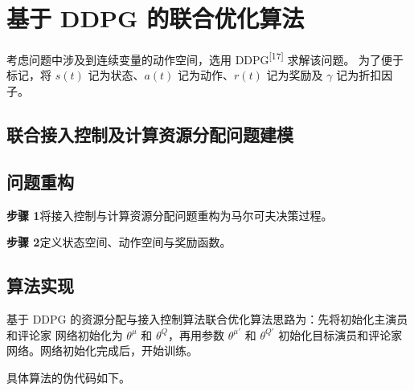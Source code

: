 \section{基于 DDPG 的联合优化算法}

\dotsline
考虑问题中涉及到连续变量的动作空间，选用 DDPG\textsuperscript{[17]} 求解该问题。
为了便于标记，将 $s(t)$ 记为状态、$a(t)$ 记为动作、$r(t)$ 记为奖励及
$\gamma$ 记为折扣因子。

\subsection{联合接入控制及计算资源分配问题建模}

\dotsline

\subsection{问题重构}

\dotsline

\textbf{步骤 1}\quad 将接入控制与计算资源分配问题重构为马尔可夫决策过程。\par
\textbf{步骤 2}\quad 定义状态空间、动作空间与奖励函数。

\subsection{算法实现}

基于 DDPG 的资源分配与接入控制算法联合优化算法思路为：先将初始化主演员和评论家
网络初始化为 $\theta^{\mu}$ 和 $\theta^{Q}$，再用参数 $\theta^{\mu'}$ 和
$\theta^{Q'}$ 初始化目标演员和评论家网络。网络初始化完成后，开始训练。

\dotsline

具体算法的伪代码如下。

